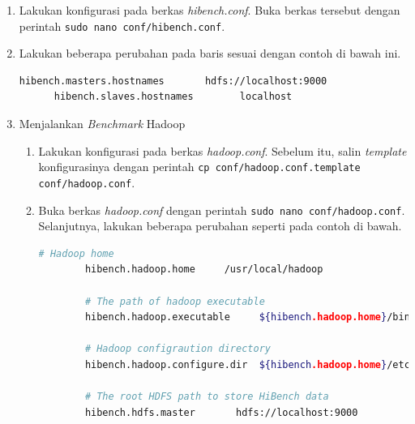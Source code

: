 \begin{enumerate}
  \item Lakukan konfigurasi pada berkas \textit{hibench.conf}. Buka berkas tersebut dengan perintah \verb|sudo nano conf/hibench.conf|.
  \item Lakukan beberapa perubahan pada baris sesuai dengan contoh di bawah ini.
    \begin{lstlisting}[language=bash]
	  hibench.masters.hostnames       hdfs://localhost:9000
	  hibench.slaves.hostnames        localhost
    \end{lstlisting}
  \item Menjalankan \textit{Benchmark} Hadoop
  \begin{enumerate}
    \item Lakukan konfigurasi pada berkas \textit{hadoop.conf}. Sebelum itu, salin \textit{template} konfigurasinya dengan perintah \verb|cp conf/hadoop.conf.template conf/hadoop.conf|.
    \item Buka berkas \textit{hadoop.conf} dengan perintah \verb|sudo nano conf/hadoop.conf|. Selanjutnya, lakukan beberapa perubahan seperti pada contoh di bawah.
      \begin{lstlisting}[language=bash]
		# Hadoop home
		hibench.hadoop.home     /usr/local/hadoop
		
		# The path of hadoop executable
		hibench.hadoop.executable     ${hibench.hadoop.home}/bin/hadoop
		
		# Hadoop configraution directory
		hibench.hadoop.configure.dir  ${hibench.hadoop.home}/etc/hadoop
		
		# The root HDFS path to store HiBench data
		hibench.hdfs.master       hdfs://localhost:9000
		

\end{lstlisting}
\end{enumerate}
\end{enumerate}
